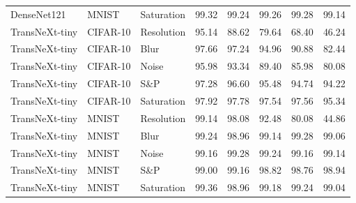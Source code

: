 \begin{table}[htbp]
\begin{tabular}{lllrrrrr}
DenseNet121 & MNIST & Saturation & 99.32 & 99.24 & 99.26 & 99.28 & 99.14 \\
TransNeXt-tiny & CIFAR-10 & Resolution & 95.14 & 88.62 & 79.64 & 68.40 & 46.24 \\
TransNeXt-tiny & CIFAR-10 & Blur & 97.66 & 97.24 & 94.96 & 90.88 & 82.44 \\
TransNeXt-tiny & CIFAR-10 & Noise & 95.98 & 93.34 & 89.40 & 85.98 & 80.08 \\
TransNeXt-tiny & CIFAR-10 & S\&P & 97.28 & 96.60 & 95.48 & 94.74 & 94.22 \\
TransNeXt-tiny & CIFAR-10 & Saturation & 97.92 & 97.78 & 97.54 & 97.56 & 95.34 \\
TransNeXt-tiny & MNIST & Resolution & 99.14 & 98.08 & 92.48 & 80.08 & 44.86 \\
TransNeXt-tiny & MNIST & Blur & 99.24 & 98.96 & 99.14 & 99.28 & 99.06 \\
TransNeXt-tiny & MNIST & Noise & 99.16 & 99.28 & 99.24 & 99.16 & 99.14 \\
TransNeXt-tiny & MNIST & S\&P & 99.00 & 99.16 & 98.82 & 98.76 & 98.94 \\
TransNeXt-tiny & MNIST & Saturation & 99.36 & 98.96 & 99.18 & 99.24 & 99.04 \\
\bottomrule
\end{tabular}
\end{table}
